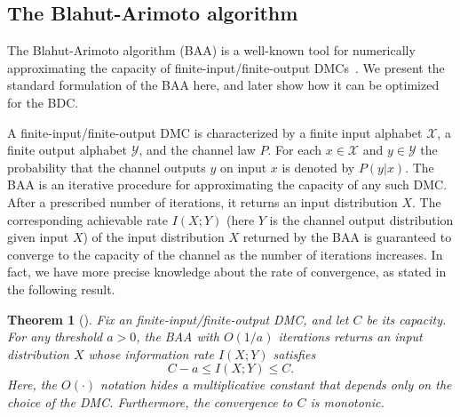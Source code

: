 \documentclass[11pt]{article}
\newcommand{\cX}{\mathcal{X}}
\newcommand{\cY}{\mathcal{Y}}
\newtheorem{theorem}{Theorem}
\begin{document}
\subsection{The Blahut-Arimoto algorithm}\label{sec:baa}

The Blahut-Arimoto algorithm (BAA) is a well-known tool for numerically approximating the capacity of finite-input/finite-output DMCs~\cite{Ari72,Bla72}. 
We present the standard formulation of the BAA here, and later show how it can be optimized for the BDC.

A finite-input/finite-output DMC is characterized by a finite input alphabet $\mathcal{X}$, a finite output alphabet $\mathcal{Y}$, and the channel law $P$.
For each $x\in\cX$ and $y\in\cY$ the probability that the channel outputs $y$ on input $x$ is denoted by $P(y|x)$.
The BAA is an iterative procedure for approximating the capacity of any such DMC.
After a prescribed number of iterations, it returns an input distribution $X$.
The corresponding achievable rate $I(X;Y)$ (here $Y$ is the channel output distribution given input $X$) of the input distribution $X$ returned by the BAA is guaranteed to converge to the capacity of the channel as the number of iterations increases.
In fact, we have more precise knowledge about the rate of convergence, as stated in the following result.


 

\begin{theorem}[{\cite{Ari72}}]\label{claim:baa}
Fix an finite-input/finite-output DMC, and let $C$ be its capacity.
For any threshold $a > 0$, the BAA with $O(1/a)$ iterations
returns an input distribution $X$ whose information rate $I(X;Y)$ satisfies
\[
    C-a\leq I(X;Y)\leq C.
\]
Here, the $O(\cdot)$ notation hides a multiplicative constant that depends only on the choice of the DMC.
Furthermore, the convergence to $C$ is monotonic.
\end{theorem}
\end{document}
